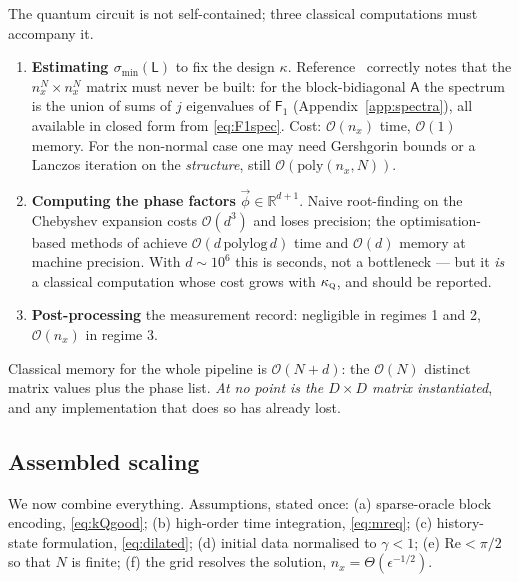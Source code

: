 \documentclass[11pt,a4paper]{article}
\theoremstyle{plain}
\theoremstyle{definition}
\theoremstyle{remark}
\newcommand{\R}{\mathbb{R}}
\newcommand{\Rey}{\mathrm{Re}}
\newcommand{\Oh}{\mathcal{O}}
\newcommand{\Lmat}{\mathsf{L}}
\newcommand{\Amat}{\mathsf{A}}
\newcommand{\Fone}{\mathsf{F}_1}
\newcommand{\kQ}{\kappa_{\textsc{q}}}
\begin{document}
The quantum circuit is not self-contained; three classical computations must
accompany it.

\begin{enumerate}[nosep,leftmargin=*]
\item \textbf{Estimating $\sigma_{\min}(\Lmat)$} to fix the design $\kappa$.
Reference~\cite{Setty2026} correctly notes that the $n_x^N\times n_x^N$ matrix
must never be built: for the block-bidiagonal $\Amat$ the spectrum is the union
of sums of $j$ eigenvalues of $\Fone$ (Appendix~\ref{app:spectra}), all available
in closed form from \eqref{eq:F1spec}.  Cost: $\Oh(n_x)$ time, $\Oh(1)$ memory.
For the non-normal case one may need Gershgorin bounds or a Lanczos iteration on
the \emph{structure}, still $\Oh(\mathrm{poly}(n_x,N))$.

\item \textbf{Computing the phase factors} $\vec\phi\in\R^{d+1}$.  Naive
root-finding on the Chebyshev expansion costs $\Oh(d^3)$ and loses precision;
the optimisation-based methods of \cite{Dong2021,Chao2020} achieve
$\Oh(d\,\mathrm{polylog}\,d)$ time and $\Oh(d)$ memory at machine precision.
With $d\sim10^{6}$ this is seconds, not a bottleneck --- but it \emph{is} a
classical computation whose cost grows with $\kQ$, and should be reported.

\item \textbf{Post-processing} the measurement record: negligible in regimes 1
and 2, $\Oh(n_x)$ in regime 3.
\end{enumerate}

Classical memory for the whole pipeline is $\Oh(N+d)$: the $\Oh(N)$ distinct
matrix values plus the phase list.  \emph{At no point is the $D\times D$ matrix
instantiated}, and any implementation that does so has already lost.

\subsection{Assembled scaling}
\label{sec:assembled}

We now combine everything.  Assumptions, stated once: (a) sparse-oracle block
encoding, \eqref{eq:kQgood}; (b) high-order time integration, \eqref{eq:mreq};
(c) history-state formulation, \eqref{eq:dilated}; (d) initial data normalised
to $\gamma<1$; (e) $\Rey<\pi/2$ so that $N$ is finite; (f) the grid resolves the
solution, $n_x=\Theta(\epsilon^{-1/2})$.
\end{document}
